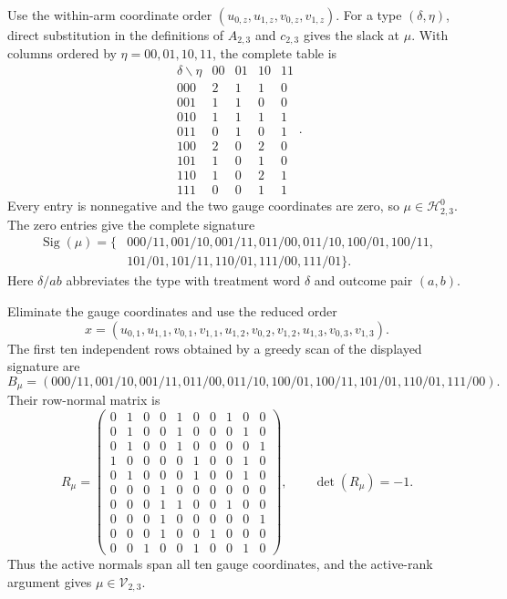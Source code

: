 Use the within-arm coordinate order \((u_{0,z},u_{1,z},v_{0,z},v_{1,z})\). For a type \((\delta,\eta)\), direct substitution in the definitions of \(A_{2,3}\) and \(c_{2,3}\) gives the slack at \(\mu\). With columns ordered by \(\eta=00,01,10,11\), the complete table is
\[\begin{array}{c|rrrr}\delta\backslash\eta&00&01&10&11\\ \hline 000&2&1&1&0\\001&1&1&0&0\\010&1&1&1&1\\011&0&1&0&1\\100&2&0&2&0\\101&1&0&1&0\\110&1&0&2&1\\111&0&0&1&1\end{array}.\]
Every entry is nonnegative and the two gauge coordinates are zero, so \(\mu\in\mathcal H^0_{2,3}\). The zero entries give the complete signature
\[\begin{split}\operatorname{Sig}(\mu)=\{&000/11,001/10,001/11,011/00,011/10,100/01,100/11,\\&101/01,101/11,110/01,111/00,111/01\}.\end{split}\]
Here \(\delta/ab\) abbreviates the type with treatment word \(\delta\) and outcome pair \((a,b)\).

Eliminate the gauge coordinates and use the reduced order
\[x=(u_{0,1},u_{1,1},v_{0,1},v_{1,1},u_{1,2},v_{0,2},v_{1,2},u_{1,3},v_{0,3},v_{1,3}).\]
The first ten independent rows obtained by a greedy scan of the displayed signature are
\[B_\mu=(000/11,001/10,001/11,011/00,011/10,100/01,100/11,101/01,110/01,111/00).\]
Their row-normal matrix is
\[R_\mu=\begin{pmatrix}0&1&0&0&1&0&0&1&0&0\\0&1&0&0&1&0&0&0&1&0\\0&1&0&0&1&0&0&0&0&1\\1&0&0&0&0&1&0&0&1&0\\0&1&0&0&0&1&0&0&1&0\\0&0&0&1&0&0&0&0&0&0\\0&0&0&1&1&0&0&1&0&0\\0&0&0&1&0&0&0&0&0&1\\0&0&0&1&0&0&1&0&0&0\\0&0&1&0&0&1&0&0&1&0\end{pmatrix},\qquad\det(R_\mu)=-1.\]
Thus the active normals span all ten gauge coordinates, and the active-rank argument gives \(\mu\in\mathcal V_{2,3}\).

